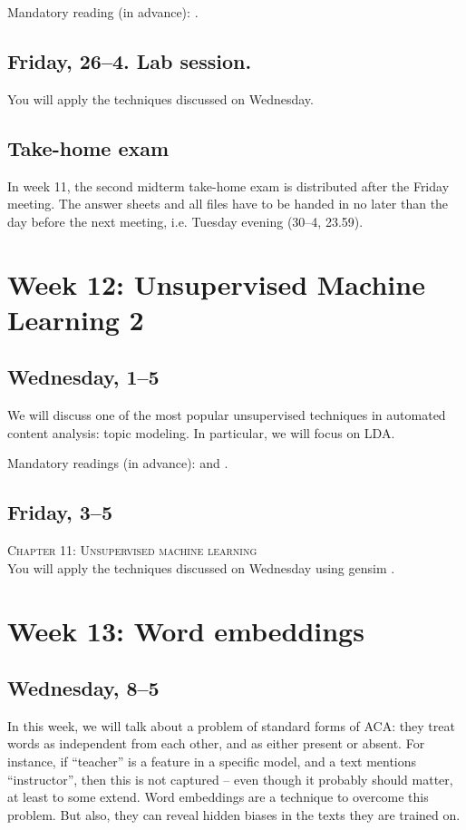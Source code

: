 \documentclass[a4paper,10pt]{report}
\begin{document}
Mandatory reading (in advance): \cite{burscher2016}.

\subsection*{Friday, 26--4. Lab session.}
You will apply the techniques discussed on Wednesday.


\subsection*{Take-home exam}
In week 11, the second midterm take-home exam is distributed after the Friday meeting. The answer sheets and all files have to be handed in no later than the day before the next meeting, i.e. Tuesday evening (30--4, 23.59).






\section*{Week 12: Unsupervised Machine Learning 2}


\subsection*{Wednesday, 1--5}
We will discuss one of the most popular unsupervised techniques in automated content analysis: topic modeling. In particular, we will focus on LDA.

Mandatory readings (in advance): \cite{Maier2018a} and \cite{Tsur2015}. 

\subsection*{Friday, 3--5}
\textsc{ Chapter 11: Unsupervised machine learning}\\
You will apply the techniques discussed on Wednesday using gensim \citep{Rehurek2010}.



\section*{Week 13: Word embeddings}

\subsection*{Wednesday, 8--5}
In this week, we will talk about a problem of standard forms of ACA: they treat words as independent from each other, and as either present or absent. For instance, if ``teacher'' is a feature in a specific model, and a text mentions ``instructor'', then this is not captured -- even though it probably should matter, at least to some extend. Word embeddings are a technique to overcome this problem. But also, they can reveal hidden biases in the texts they are trained on.
\end{document}
